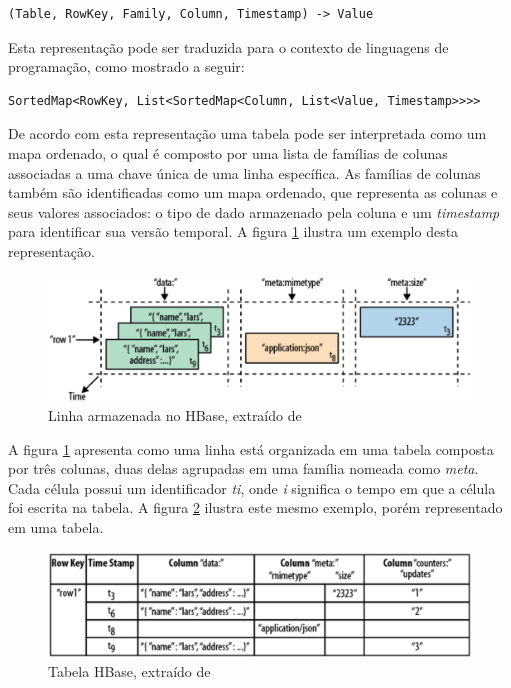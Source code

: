 \begin{lstlisting}[style=abnt,frame=none]
(Table, RowKey, Family, Column, Timestamp) -> Value
\end{lstlisting}

Esta representação pode ser traduzida para o contexto de linguagens de programação, como mostrado a seguir:

\begin{lstlisting}[style=abnt,frame=none]
SortedMap<RowKey, List<SortedMap<Column, List<Value, Timestamp>>>>
\end{lstlisting}

De acordo com esta representação uma tabela pode ser interpretada como um mapa ordenado, o qual é composto por uma lista de famílias de colunas associadas a uma chave única de uma linha específica. As famílias de colunas também são identificadas como um mapa ordenado, que representa as colunas e seus valores associados: o tipo de dado armazenado pela coluna e um \textit{timestamp} para identificar sua versão temporal. A figura \ref{fig-hbase-row} ilustra um exemplo desta representação. 

\begin{figure}[ht!]
	\centering
	\includegraphics[keepaspectratio=true,scale=0.4]
	  {figuras/hbase-row.eps}
	\caption{Linha armazenada no HBase, extraído de 
	}
	\label{fig-hbase-row}
\end{figure}
\FloatBarrier

A figura \ref{fig-hbase-row} apresenta como uma linha está organizada em uma tabela composta por três colunas, duas delas agrupadas em uma família nomeada como \textit{meta}. Cada célula possui um identificador \textit{ti}, onde \textit{i} significa o tempo em que a célula foi escrita na tabela. A figura \ref{fig-hbase-table} ilustra este mesmo exemplo, porém representado em uma tabela.

\begin{figure}[ht!]
	\centering
	\includegraphics[keepaspectratio=true,scale=0.4]
	  {figuras/hbase-table.eps}
	\caption{Tabela HBase, extraído de 
	}
	\label{fig-hbase-table}
\end{figure}
\FloatBarrier

